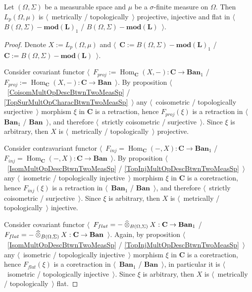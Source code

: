 \begin{proposition}\label{HomTrivlOfLpCat} Let $(\Omega,\Sigma)$ be a measurable space and $\mu$ be a $\sigma$-finite measure on $\Omega$. Then
$L_p(\Omega,\mu)$ is $\langle$~metrically / topologically~$\rangle$ projective, injective and flat in $\langle$~$B(\Omega,\Sigma)-\mathbf{mod(L)}_1$ / $B(\Omega,\Sigma)-\mathbf{mod(L)}$~$\rangle$.
\end{proposition}
\begin{proof} Denote $X:=L_p(\Omega,\mu)$ and $\langle$~$\mathbf{C}:=B(\Omega,\Sigma)-\mathbf{mod(L)}_1$ / $\mathbf{C}:=B(\Omega,\Sigma)-\mathbf{mod(L)}$~$\rangle$. 

Consider covariant functor $\langle$~$F_{proj}:=\operatorname{Hom}_{\mathbf{C}}(X,-):\mathbf{C}\to\mathbf{Ban}_1$ / $F_{proj}:=\operatorname{Hom}_{\mathbf{C}}(X,-):\mathbf{C}\to\mathbf{Ban}$~$\rangle$. By proposition $\langle$~\ref{CoisomMultOpDescBtwnTwoMeasSp} / \ref{TopSurMultOpCharacBtwnTwoMeasSp}~$\rangle$ any $\langle$~coisometric / topologically surjective~$\rangle$ morphism $\xi$ in $\mathbf{C}$ is a retraction, hence $F_{proj}(\xi)$ is a retraction in $\langle$~$\mathbf{Ban}_1$ / $\mathbf{Ban}$~$\rangle$, and therefore $\langle$~strictly coisometric / surjective~$\rangle$. Since $\xi$ is arbitrary, then $X$ is $\langle$~metrically / topologically~$\rangle$ projective.

Consider contravariant functor $\langle$~$F_{inj}=\operatorname{Hom}_{\mathbf{C}}(-,X):\mathbf{C}\to\mathbf{Ban}_1$ / $F_{inj}=\operatorname{Hom}_{\mathbf{C}}(-,X):\mathbf{C}\to\mathbf{Ban}$~$\rangle$. By proposition $\langle$~\ref{IsomMultOpDescBtwnTwoMeasSp} / \ref{TopInjMultOpDescBtwnTwoMeasSp}~$\rangle$ any $\langle$~isometric / topologically injective~$\rangle$ morphism $\xi$ in $\mathbf{C}$ is a coretraction, hence $F_{inj}(\xi)$ is a retraction in $\langle$~$\mathbf{Ban}_1$ / $\mathbf{Ban}$~$\rangle$, and therefore $\langle$~strictly coisometric / surjective~$\rangle$. Since $\xi$ is arbitrary, then $X$ is $\langle$~metrically / topologically~$\rangle$ injective.

Consider covariant functor $\langle$~$F_{flat}=-\mathbin{\widehat{\otimes}}_{B(\Omega,\Sigma)}X:\mathbf{C}\to\mathbf{Ban}_1$ / $F_{flat}=-\mathbin{\widehat{\otimes}}_{B(\Omega,\Sigma)}X:\mathbf{C}\to\mathbf{Ban}$~$\rangle$. Again, by proposition $\langle$~\ref{IsomMultOpDescBtwnTwoMeasSp} / \ref{TopInjMultOpDescBtwnTwoMeasSp}~$\rangle$ any $\langle$~isometric / topologically injective~$\rangle$ morphism $\xi$ in $\mathbf{C}$ is a coretraction, hence  $F_{flat}(\xi)$ is a coretraction in $\langle$~$\mathbf{Ban}_1$ / $\mathbf{Ban}$~$\rangle$, in particular it is $\langle$~isometric / topologically injective~$\rangle$. Since $\xi$ is arbitrary, then $X$ is $\langle$~metrically / topologically~$\rangle$ flat.
\end{proof}